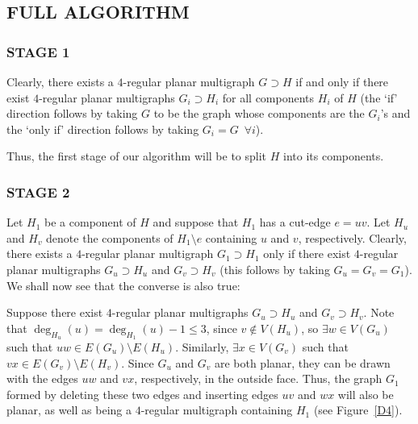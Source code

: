 \documentclass{article}
\newtheorem{Proof of Theorem}{Proof of Theorem}
\begin{document}
\subsection*{FULL ALGORITHM}





\subsubsection*{STAGE 1} 





Clearly, there exists a $4$-regular planar multigraph $G \supset H$ if and only if
there exist $4$-regular planar multigraphs $G_{i} \supset H_{i}$ for all components $H_{i}$ of $H$
(the `if' direction follows by taking $G$ to be the graph whose components are the $G_{i}$'s 
and the `only if' direction follows by taking $G_{i}=G$~$\forall i$).

Thus, the first stage of our algorithm will be to split $H$ into its components. 





\subsubsection*{STAGE 2} 





Let $H_{1}$ be a component of $H$ and suppose that $H_{1}$ has a cut-edge $e=uv$.
Let $H_{u}$ and $H_{v}$ denote the components of $H_{1} \setminus e$ containing $u$ and $v$, respectively.
Clearly, there exists a $4$-regular planar multigraph $G_{1} \supset H_{1}$ only if
there exist $4$-regular planar multigraphs $G_{u} \supset H_{u}$ and $G_{v} \supset H_{v}$
(this follows by taking $G_{u}=G_{v}=G_{1}$).
We shall now see that the converse is also true:

Suppose there exist $4$-regular planar multigraphs $G_{u} \supset H_{u}$ and $G_{v} \supset H_{v}$.
Note that $\deg_{H_{u}}(u) = \deg_{H_{1}}(u)-1 \leq 3$,
since $v \notin V(H_{u})$,
so $\exists w \in V(G_{u})$ such that
$uw \in E(G_{u}) \setminus E(H_{u})$.
Similarly,
$\exists x \in V(G_{v})$ such that
$vx \in E(G_{v}) \setminus E(H_{v})$.
Since $G_{u}$ and $G_{v}$ are both planar,
they can be drawn with the edges $uw$ and $vx$, respectively, in the outside face.
Thus, the graph $G_{1}$ formed by deleting these two edges and inserting edges $uv$ and $wx$ will also be planar,
as well as being a $4$-regular multigraph containing $H_{1}$ (see Figure~\ref{D4}).
\end{document}
